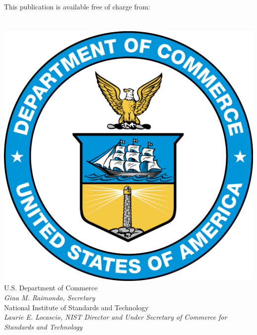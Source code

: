 \begin{titlepage}
\begin{flushright}
            \vfill
            \normalsize This publication is available free of charge from:\\
            \DOI\\
            \vfill
            \normalsize \pubmonth~\pubyear\\
            \vfill
            \includegraphics[width=0.2\linewidth]{Figures/Logos/DoC-logo.pdf}\\ 
            \vfill
            \footnotesize U.S. Department of Commerce\\ 
            \textit{Gina M. Raimondo, Secretary}\\
            \vspace{10pt}
            National Institute of Standards and Technology\\ 
            \hspace*{-3cm}\textit{Laurie E. Locascio, NIST Director and Under Secretary of Commerce for Standards and Technology}  
        \end{flushright}
        

\end{titlepage}
